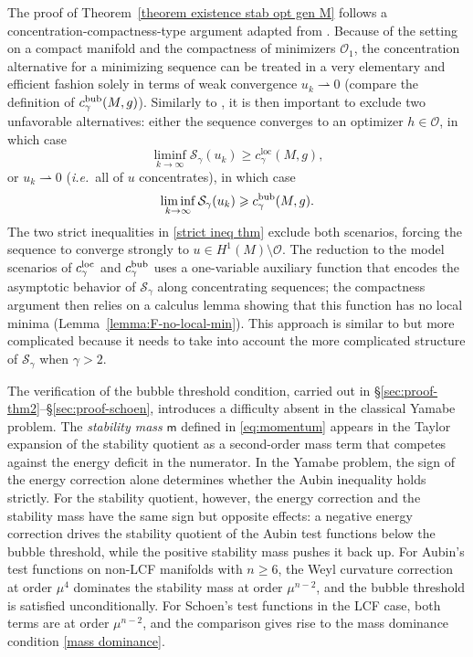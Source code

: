 \documentclass[reqno,11pt]{amsart}
\numberwithin{equation}{section}
\theoremstyle{definition}
\theoremstyle{remark}
\begin{document}
\medskip
{}
The proof of Theorem~\ref{theorem existence stab opt gen M} follows a concentration-compactness-type 
argument adapted from \cite{arXiv:2211.14185}. 
Because of the setting 
on a compact manifold and the compactness of minimizers $\mathscr O_1$, the concentration 
alternative for a minimizing sequence can be treated in a very elementary and efficient  
fashion solely in terms of weak convergence $u_k \rightharpoonup 0$ (compare the definition 
of $c_{\gamma}^{\rm bub}(M,g)$).
Similarly to \cite{arXiv:2211.14185}, it is then important to exclude two unfavorable 
alternatives:  either the sequence converges to an optimizer $h \in \mathscr{O}$, in which case 
\[
\liminf_{k \to \infty} \mathcal{S}_\gamma(u_k) \geqslant c_{\gamma}^{\mathrm{loc}}(M,g),
\]
or $u_k \rightharpoonup 0$ ({\it i.e.}\ all of $u$ concentrates), in which case
\[
\liminf_{k \to \infty} \mathcal{S}_\gamma(u_k) \geqslant c_{\gamma}^{\rm bub}(M,g).
\]
The two strict inequalities in \eqref{strict ineq thm} exclude both scenarios, forcing the
sequence to converge strongly to $u \in H^1(M) \setminus \mathscr O$. The reduction to the model 
scenarios of $c_\gamma^{\rm loc}$ and $c_\gamma^{\rm bub}$ uses
a one-variable auxiliary function that encodes the asymptotic behavior
of $\mathcal{S}_\gamma$ along concentrating sequences; the compactness argument then relies on a
calculus lemma showing that this function has no local minima (Lemma~\ref{lemma:F-no-local-min}). This 
approach is similar to \cite{arXiv:2211.14185} but more complicated because it needs to take into account the 
more complicated structure of $\mathcal S_\gamma$ when $\gamma > 2$. 

The verification of the bubble threshold condition, carried out
in \S\ref{sec:proof-thm2}--\S\ref{sec:proof-schoen}, introduces a difficulty absent in the
classical Yamabe problem. The \emph{stability mass} $\mathsf{m}$ defined in \eqref{eq:momentum}
appears in the Taylor expansion of the stability quotient as a second-order mass term that competes against the energy deficit in
the numerator. In the Yamabe problem, the sign of the energy correction alone determines whether the
Aubin inequality holds strictly. For the stability quotient, however, the energy correction
and the stability mass have the same sign but opposite
effects: a negative energy correction
drives the stability quotient of the Aubin test functions below the bubble threshold, while the positive stability mass pushes it
back up. For Aubin's test functions on non-LCF manifolds with $n \geqslant 6$, the Weyl curvature
correction at order $\mu^4$ dominates the stability mass at order $\mu^{n-2}$,
and the bubble threshold is satisfied unconditionally. For Schoen's test functions in the LCF case,
both terms are at order $\mu^{n-2}$, and the comparison gives rise to the mass dominance
condition \eqref{mass dominance}.
\end{document}
